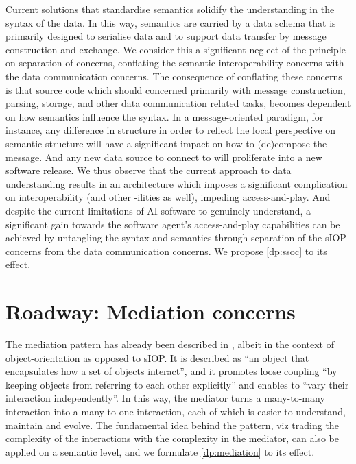 \documentclass[sort&compress,preprint,authoryear,3p,twocolumn]{elsarticle}
\begin{document}
Current solutions that standardise semantics solidify the understanding
in the syntax of the data. In this way, semantics are carried by a data
schema that is primarily designed to serialise data and to support data
transfer by message construction and exchange. We consider this a
significant neglect of the principle on separation of concerns,
conflating the semantic interoperability concerns with the data
communication concerns. The consequence of conflating these concerns is
that source code which should concerned primarily with message
construction, parsing, storage, and other data communication related
tasks, becomes dependent on how semantics influence the syntax. In a
message-oriented paradigm, for instance, any difference in structure in
order to reflect the local perspective on semantic structure will have a
significant impact on how to (de)compose the message. And any new data
source to connect to will proliferate into a new software release. We
thus observe that the current approach to data understanding results in
an architecture which imposes a significant complication on
interoperability (and other -ilities as well), impeding access-and-play.
And despite the current limitations of AI-software to genuinely
understand, a significant gain towards the software agent's
access-and-play capabilities can be achieved by untangling the syntax
and semantics through separation of the sIOP concerns from the data
communication concerns. We propose \cref{dp:ssoc} to its effect.

\hypertarget{roadway-mediation-concerns}{%
\section{Roadway: Mediation concerns}\label{roadway-mediation-concerns}}

The mediation pattern has already been described in \citep{Gamma1994},
albeit in the context of object-orientation as opposed to sIOP. It is
described as ``an object that encapsulates how a set of objects
interact'', and it promotes loose coupling ``by keeping objects from
referring to each other explicitly'' and enables to ``vary their
interaction independently''. In this way, the mediator turns a
many-to-many interaction into a many-to-one interaction, each of which
is easier to understand, maintain and evolve. The fundamental idea
behind the pattern, viz trading the complexity of the interactions with
the complexity in the mediator, can also be applied on a semantic level,
and we formulate \cref{dp:mediation} to its effect.
\end{document}
